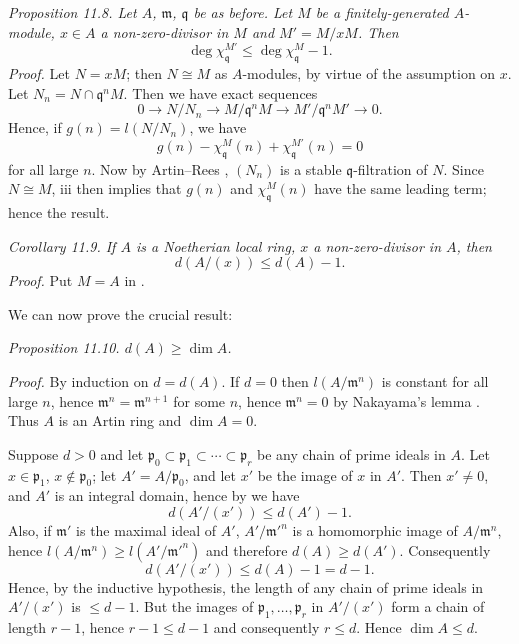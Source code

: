 
\noindent\textit{Proposition 11.8. Let $A$, $\mathfrak m$, $\mathfrak q$ be as before. Let $M$ be a finitely-generated $A$-module, $x\in A$ a non-zero-divisor in $M$ and $M'=M/xM$. Then}
\[
 \deg\chi_{\mathfrak q}^{M'}\leq \deg\chi_{\mathfrak q}^{M}-1.
\]
\textit{Proof.} Let $N=xM$; then $N\cong M$ as $A$-modules, by virtue of the assumption on $x$. Let $N_n=N\cap\mathfrak q^nM$. Then we have exact sequences
\[
 0\longrightarrow N/N_n\longrightarrow M/\mathfrak q^nM\longrightarrow M'/\mathfrak q^nM'\longrightarrow 0.
\]
Hence, if $g(n)=l(N/N_n)$, we have
\[
 g(n)-\chi_{\mathfrak q}^{M}(n)+\chi_{\mathfrak q}^{M'}(n)=0
\]
for all large $n$. Now by Artin--Rees , $(N_n)$ is a stable $\mathfrak q$-filtration of $N$. Since $N\cong M$,  iii then implies that $g(n)$ and $\chi_{\mathfrak q}^{M}(n)$ have the same leading term; hence the result. \proofbox

\medskip
\noindent\textit{Corollary 11.9. If $A$ is a Noetherian local ring, $x$ a non-zero-divisor in $A$, then}
\[
 d(A/(x))\leq d(A)-1.
\]
\textit{Proof.} Put $M=A$ in . \proofbox

We can now prove the crucial result:

\medskip
\noindent\textit{Proposition 11.10. $d(A)\geq\dim A$.}

\textit{Proof.} By induction on $d=d(A)$. If $d=0$ then $l(A/\mathfrak m^n)$ is constant for all large $n$, hence $\mathfrak m^n=\mathfrak m^{n+1}$ for some $n$, hence $\mathfrak m^n=0$ by Nakayama's lemma . Thus $A$ is an Artin ring and $\dim A=0$.

Suppose $d>0$ and let $\mathfrak p_0\subset\mathfrak p_1\subset\cdots\subset\mathfrak p_r$ be any chain of prime ideals in $A$. Let $x\in\mathfrak p_1$, $x\notin\mathfrak p_0$; let $A'=A/\mathfrak p_0$, and let $x'$ be the image of $x$ in $A'$. Then $x'\neq0$, and $A'$ is an integral domain, hence by  we have
\[
 d(A'/(x'))\leq d(A')-1.
\]
Also, if $\mathfrak m'$ is the maximal ideal of $A'$, $A'/\mathfrak m'^n$ is a homomorphic image of $A/\mathfrak m^n$, hence $l(A/\mathfrak m^n)\geq l(A'/\mathfrak m'^n)$ and therefore $d(A)\geq d(A')$. Consequently
\[
 d(A'/(x'))\leq d(A)-1=d-1.
\]
Hence, by the inductive hypothesis, the length of any chain of prime ideals in $A'/(x')$ is $\leq d-1$. But the images of $\mathfrak p_1,\ldots,\mathfrak p_r$ in $A'/(x')$ form a chain of length $r-1$, hence $r-1\leq d-1$ and consequently $r\leq d$. Hence $\dim A\leq d$. \proofbox


